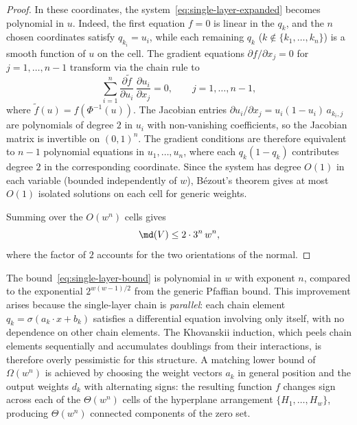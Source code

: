 \begin{proof}
In these coordinates, the system~\eqref{eq:single-layer-expanded} becomes polynomial in $u$. Indeed, the first equation $f = 0$ is linear in the $q_k$, and the $n$ chosen coordinates satisfy $q_{k_i} = u_i$, while each remaining $q_k$ ($k\notin \{k_1,\ldots,k_n\}$) is a smooth function of $u$ on the cell. The gradient equations $\partial f/\partial x_j = 0$ for $j = 1,\ldots,n-1$ transform via the chain rule to
\begin{equation*}
  \sum_{i=1}^n \frac{\partial \tilde{f}}{\partial u_i}\, \frac{\partial u_i}{\partial x_j} = 0, \qquad j = 1,\ldots,n-1,
\end{equation*}
where $\tilde{f}(u) = f(\Phi^{-1}(u))$. The Jacobian entries $\partial u_i/\partial x_j = u_i(1-u_i)\,a_{k_i,j}$ are polynomials of degree $2$ in $u_i$ with non-vanishing coefficients, so the Jacobian matrix is invertible on $(0,1)^n$. The gradient conditions are therefore equivalent to $n-1$ polynomial equations in $u_1,\ldots,u_n$, where each $q_k(1-q_k)$ contributes degree $2$ in the corresponding coordinate. Since the system has degree $O(1)$ in each variable (bounded independently of $w$), B\'ezout's theorem gives at most $O(1)$ isolated solutions on each cell for generic weights.

Summing over the $O(w^n)$ cells gives
\begin{equation*}
  \md(V) \leq 2\cdot 3^n\, w^n,
\end{equation*}
where the factor of $2$ accounts for the two orientations of the normal.
\end{proof}

\begin{remark}
The bound~\eqref{eq:single-layer-bound} is polynomial in $w$ with exponent $n$, compared to the exponential $2^{w(w-1)/2}$ from the generic Pfaffian bound. This improvement arises because the single-layer chain is \emph{parallel}: each chain element $q_k = \sigma(a_k\cdot x + b_k)$ satisfies a differential equation involving only itself, with no dependence on other chain elements. The Khovanskii induction, which peels chain elements sequentially and accumulates doublings from their interactions, is therefore overly pessimistic for this structure. A matching lower bound of $\Omega(w^n)$ is achieved by choosing the weight vectors $a_k$ in general position and the output weights $d_k$ with alternating signs: the resulting function $f$ changes sign across each of the $\Theta(w^n)$ cells of the hyperplane arrangement $\{H_1,\ldots,H_w\}$, producing $\Theta(w^n)$ connected components of the zero set.
\end{remark}

